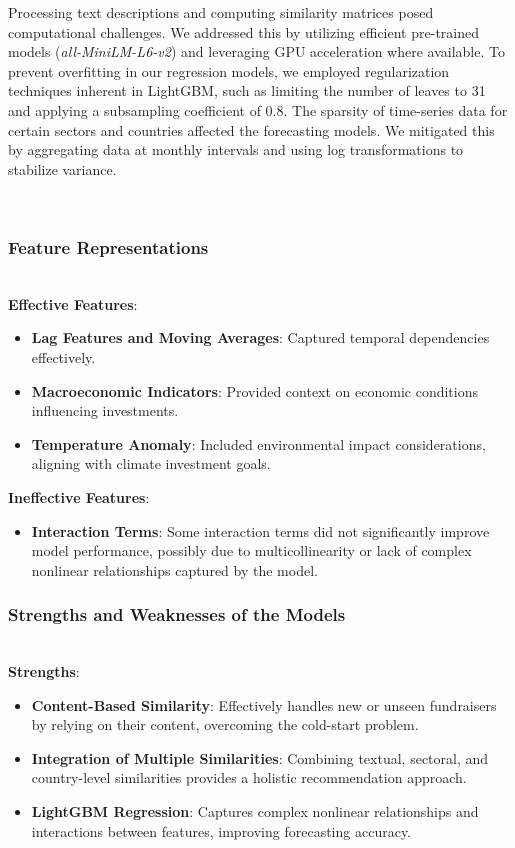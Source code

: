 \documentclass[sigconf]{acmart}
\begin{document}
Processing text descriptions and computing similarity matrices posed computational challenges. We addressed this by utilizing efficient pre-trained models (\textit{all-MiniLM-L6-v2}) and leveraging GPU acceleration where available. To prevent overfitting in our regression models, we employed regularization techniques inherent in LightGBM, such as limiting the number of leaves to 31 and applying a subsampling coefficient of 0.8. The sparsity of time-series data for certain sectors and countries affected the forecasting models. We mitigated this by aggregating data at monthly intervals and using log transformations to stabilize variance.

\mbox{}\\

\subsubsection{Feature Representations}\mbox{}\\

\textbf{Effective Features}:

\begin{itemize}
    \item \textbf{Lag Features and Moving Averages}: Captured temporal dependencies effectively.
    \item \textbf{Macroeconomic Indicators}: Provided context on economic conditions influencing investments.
    \item \textbf{Temperature Anomaly}: Included environmental impact considerations, aligning with climate investment goals.
\end{itemize}

\textbf{Ineffective Features}:

\begin{itemize}
    \item \textbf{Interaction Terms}: Some interaction terms did not significantly improve model performance, possibly due to multicollinearity or lack of complex nonlinear relationships captured by the model.
\end{itemize}

\subsubsection{Strengths and Weaknesses of the Models}\mbox{}\\

\textbf{Strengths}:

\begin{itemize}
    \item \textbf{Content-Based Similarity}: Effectively handles new or unseen fundraisers by relying on their content, overcoming the cold-start problem.
    \item \textbf{Integration of Multiple Similarities}: Combining textual, sectoral, and country-level similarities provides a holistic recommendation approach.
    \item \textbf{LightGBM Regression}: Captures complex nonlinear relationships and interactions between features, improving forecasting accuracy.
\end{itemize}
\end{document}
